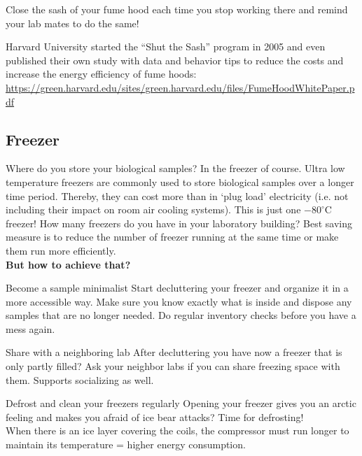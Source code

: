 \begin{suggest}{Close the sash of your fume hood each time you stop working there and remind your lab mates to do the same!}
\end{suggest}


Harvard University started the “Shut the Sash” program in 2005 and even published their own study with data and behavior tips to reduce the costs and increase the energy efficiency of fume hoods:   \\ \url{https://green.harvard.edu/sites/green.harvard.edu/files/FumeHoodWhitePaper.pdf}

\subsection{Freezer }
Where do you store your biological samples? In the freezer of course. 
Ultra low temperature freezers are commonly used to store biological samples over a longer time period. Thereby, they can cost more than  in ‘plug load’ electricity (i.e. not including their impact on room air cooling systems). This is just one $-80^\circ \text{C}$ freezer!
How many freezers do you have in your laboratory building? 
Best saving measure is to reduce the number of freezer running at the same time or make them run more efficiently. \\

\textbf{But how to achieve that?  }

\begin{suggest}{Become a sample minimalist}
		Start decluttering your freezer and organize it in a more accessible way. Make sure you know exactly what is inside and dispose any samples that are no longer needed. Do regular inventory checks before you have a mess again. 
\end{suggest}

\begin{suggest}{Share with a neighboring lab}
	After decluttering you have now a freezer that is only partly filled? Ask your neighbor labs if you can share freezing space with them. Supports socializing as well.
\end{suggest}

\begin{suggest}{Defrost and clean your freezers regularly}
	Opening your freezer gives you an arctic feeling and makes you afraid of ice bear attacks? Time for defrosting!\\ 
	When there is an ice layer covering the coils, the compressor must run longer to maintain its temperature = higher energy consumption.
\end{suggest}

